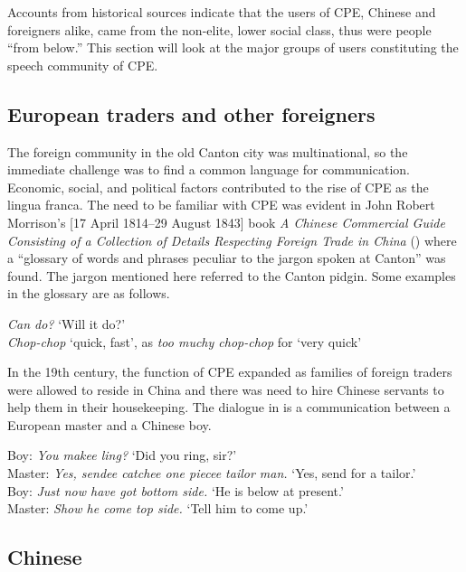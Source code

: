 \documentclass[output=paper]{langsci/langscibook}
\begin{document}
Accounts from historical sources indicate that the users of CPE, Chinese and foreigners alike, came from the non-elite, lower social class, thus were people “from below.” This section will look at the major groups of users constituting the speech community of CPE. 

\subsection{European traders and other foreigners}

The foreign community in the old Canton city was multinational, so the immediate challenge was to find a common language for communication. Economic, social, and political factors contributed to the rise of CPE as the lingua franca. The need to be familiar with CPE was evident in John Robert Morrison’s [17 April 1814--29 August 1843] book \textit{A Chinese Commercial Guide Consisting of a Collection of Details Respecting Foreign Trade in China} (\citeyear{morrison_chinese_1834}) where a “glossary of words and phrases peculiar to the jargon spoken at Canton” was found. The jargon mentioned here referred to the Canton pidgin. Some examples in the glossary are as follows.

\ea 
    \label{ex:7:1}
    \textit{Can do?} ‘Will it do?’\\
    \textit{Chop-chop} ‘quick, fast’, as \textit{too muchy chop-chop} for ‘very quick’
\z

In the 19th century, the function of CPE expanded as families of foreign traders were allowed to reside in China and there was need to hire Chinese servants to help them in their housekeeping. The dialogue in  is a communication between a European master and a Chinese boy. 

\ea \label{ex:7:2}
Boy: \textit{You makee ling?} ‘Did you ring, sir?’\\
Master: \textit{Yes, sendee catchee one piecee tailor man.} ‘Yes, send for a tailor.’\\
Boy: \textit{Just now have got bottom side.} ‘He is below at present.’\\
Master: \textit{Show he come top side.} ‘Tell him to come up.’\\

\citep[43]{anonymous_englishman_1860}
\z

\subsection{Chinese}
\end{document}
